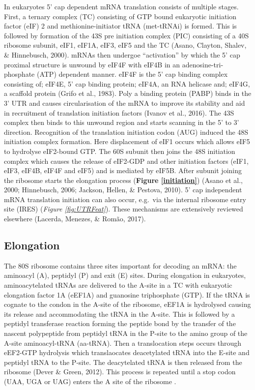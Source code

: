 \documentclass[12pt,openany]{book}
\begin{document}
In eukaryotes 5' cap dependent mRNA translation consists of multiple
stages. First, a ternary complex (TC) consisting of GTP bound eukaryotic
initiation factor (eIF) 2 and methionine-initiator tRNA (met-tRNAi) is
formed. This is followed by formation of the 43S pre initiation complex
(PIC) consisting of a 40S ribosome subunit, eIF1, eIF1A, eIF3, eIF5 and
the TC (Asano, Clayton, Shalev, \& Hinnebusch, 2000). mRNAs then
undergoe ``activation'' by which the 5' cap proximal structure is
unwound by eIF4F with eIF4B in an adenosine-tri-phosphate (ATP)
dependent manner. eIF4F is the 5' cap binding complex consisting of;
eIF4E, 5' cap binding protein; eIF4A, an RNA helicase and; eIF4G, a
scaffold protein (Grifo et al., 1983). Poly a binding protein (PABP)
binds in the 3' UTR and causes circularisation of the mRNA to improve
its stability and aid in recruitment of translation initiation factors
(Ivanov et al., 2016). The 43S complex then binds to this unwound region
and starts scanning in the 5' to 3' direction. Recognition of the
translation initiation codon (AUG) induced the 48S initiation complex
formation. Here displacement of eIF1 occurs which allows eIF5 to
hydrolyse eIF2-bound GTP. The 60S subunit then joins the 48S initiation
complex which causes the release of eIF2-GDP and other initiation
factors (eIF1, eIF3, eIF4B, eIF4F and eIF5) and is mediated by eIF5B.
After subunit joining the ribosome starts the elongation process
(\textbf{Figure \ref{initiation}}) (Asano et al., 2000; Hinnebusch,
2006; Jackson, Hellen, \& Pestova, 2010). 5' cap independent mRNA
translation initiation can also occur, e.g.~via the internal ribosome
entry site (IRES) (\emph{Figure \ref{fig:UTRFeat}}). These mechanisms
are extensively reviewed elsewhere (Lacerda, Menezes, \& Romão, 2017).

\subsection{Elongation}

The 80S ribosome contains three sites important for decoding an mRNA:
the aminoacyl (A), peptidyl (P) and exit (E) sites. During elongation in
eukaryotes, aminoacytelated tRNAs are delivered to the A-site in a TC
with eukaryotic elongation factor 1A (eEF1A) and guanosine triphosphate
(GTP). If the tRNA is cognate to the condon in the A-site of the
ribosome, eEF1A is hydrolysed causing its release and accommodating the
tRNA in the A-site. This is followed by a peptidyl transferase reaction
forming the peptide bond by the transfer of the nascent polypeptide from
peptidyl tRNA in the P-site to the amino group of the A-site
aminoacyl-tRNA (aa-tRNA). Then a translocation steps occurs through
eEF2-GTP hydrolysis which translaocates deacetylated tRNA into the
E-site and peptidyl tRNA to the P-site. The deacytelated tRNA is then
released from the ribosome (Dever \& Green, 2012). This process is
repeated until a stop codon (UAA, UGA or UAG) enters the A site of the
ribosome .
\end{document}
